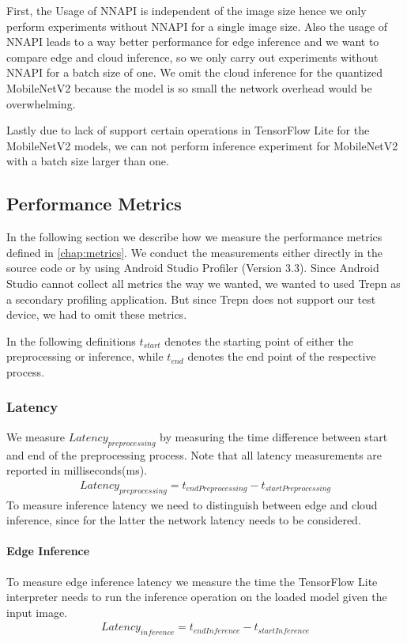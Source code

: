 First, the Usage of NNAPI is independent of the image size hence we only perform experiments without NNAPI for a single image size. Also the usage of NNAPI leads to a way better performance for edge inference and we want to compare edge and cloud inference, so we only carry out experiments without NNAPI for a batch size of one.
We omit the cloud inference for the quantized MobileNetV2 because the model is so small the network overhead would be overwhelming.%

Lastly due to lack of support certain operations in TensorFlow Lite for the MobileNetV2 models, we can not perform inference experiment for MobileNetV2 with a batch size larger than one.
\subsection{Performance Metrics}
\label{chap:insta_measurements}
In the following section we describe how we measure the performance metrics defined in \ref{chap:metrics}.
We conduct the measurements either directly in the source code or by using Android Studio Profiler (Version 3.3). Since Android Studio cannot collect all metrics the way we wanted, we wanted to used Trepn as a secondary profiling application. But since Trepn does not support our test device, we had to omit these metrics.

In the following definitions $t_{start}$ denotes the starting point of either the preprocessing or inference, while $t_{end}$ denotes the end point of the respective process.
\subsubsection{Latency}
We measure $Latency_{preprocessing}$ by measuring the time difference between start and end of the preprocessing process.
Note that all latency measurements are reported in milliseconds(ms).
\begin{equation*}
\begin{gathered}
Latency_{preprocessing} = t_{endPreprocessing} - t_{startPreprocessing}
\end{gathered}
\end{equation*}
To measure inference latency we need to distinguish between edge and cloud inference, since for the latter the network latency needs to be considered.

\paragraph{Edge Inference}To measure edge inference latency we measure the time the TensorFlow Lite interpreter needs to run the inference operation on the loaded model given the input image.
\begin{equation*}
\begin{gathered}
Latency_{inference} = t_{endInference} - t_{startInference}
\end{gathered}
\end{equation*}
